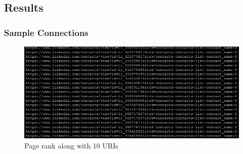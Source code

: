 \subsection{Results}
\subsubsection{Sample Connections}
\begin{figure}[ht]    
    \begin{center}
        \includegraphics[scale=0.70]{sample_connections.png}
        \caption{Page rank along with 10 URIs}
        \label{Sample Connections}
    \end{center}
\end{figure}

